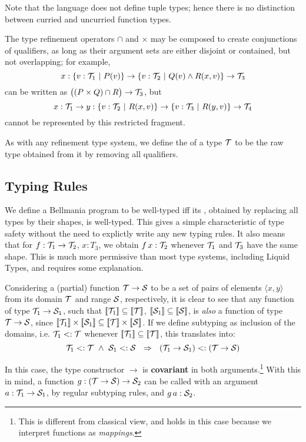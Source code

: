 Note that the language does not define tuple types; hence there is no distinction between curried and uncurried function types.

\medskip  
The type refinement operators $\cap$ and $\times$ may be composed to create conjunctions of qualifiers,
as long as their argument sets are either disjoint or contained, but not overlapping;
for example, \[x:\{v:\T_1~|~P(v)\}\to \{v:\T_2~|~Q(v)\land R(x,v)\}\to\T_3\] can be written as
$\big((P\times Q)\cap R\big)\to\T_3$, but \[x:\T_1\to y:\{v:\T_2~|~R(x,v)\} \to \{v:\T_3~|~R(y,v)\}\to\T_4\]
cannot be represented by this restricted fragment.

As with any refinement type system, we define the  of a type $\T$ to be the raw type
obtained from it by removing all qualifiers.

\subsection{Typing Rules}
\label{lang:typing rules}

\newcommand\powerset[1]{\mathbf{P}({#1})}

We define a Bellmania program to be well-typed iff its , obtained by replacing all types by
their shapes, is well-typed. This gives a simple characteristic of type safety without the need to
explictly write any new typing rules. It also means that for $f:\T_1\to\T_2$, $x:T_3$, we obtain $f\,x:\T_2$ whenever
$\T_1$ and $\T_3$ have the same shape. This is much more permissive than most type systems,
including Liquid Types, and requires some explanation.

Considering a (partial) function $\T\to\S$ to be a set of pairs of elements $\langle x,y\rangle$ 
from its domain $\T$ and range $\S$, respectively, it is clear to see that any function of type $\T_1\to\S_1$,
such that $\semp{\T_1}\subseteq\semp{\T}$, $\semp{\S_1}\subseteq\semp{\S}$, 
is \emph{also} a function of type $\T\to\S$, since $\semp{\T_1}\times\semp{\S_1}\subseteq\semp{\T}\times\semp{\S}$.
If we define subtyping as inclusion of the domains, i.e. $\T_1 <:\T$ whenever $\semp{\T_1}\subseteq\semp{\T}$,
this translates into:
%
\[\T_1<:\T ~\land~ \S_1<:\S ~~\Rightarrow~~ (\T_1\to\S_1) <: (\T\to\S)\]

In this case, the type constructor $\to$ is {\bf covariant} in both arguments.\footnote{This is different from classical view, and holds in this case because we interpret functions as \emph{mappings}.}
With this in mind, a function $g:(\T\to\S)\to \S_2$ can be called with an argument $a: \T_1\to\S_1$,
by regular subtyping rules, and $g\,a : \S_2$.


